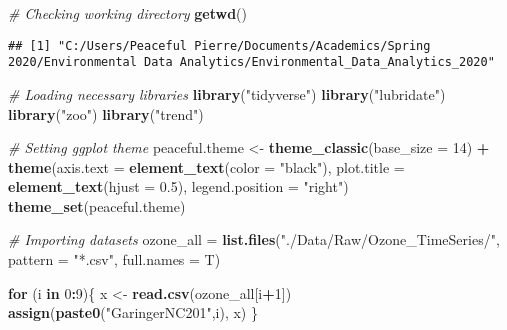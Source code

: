 \documentclass[
]{article}
\newenvironment{Shaded}{\begin{snugshade}}{\end{snugshade}}
\newcommand{\CommentTok}[1]{\textcolor[rgb]{0.56,0.35,0.01}{\textit{#1}}}
\newcommand{\ControlFlowTok}[1]{\textcolor[rgb]{0.13,0.29,0.53}{\textbf{#1}}}
\newcommand{\DataTypeTok}[1]{\textcolor[rgb]{0.13,0.29,0.53}{#1}}
\newcommand{\DecValTok}[1]{\textcolor[rgb]{0.00,0.00,0.81}{#1}}
\newcommand{\FloatTok}[1]{\textcolor[rgb]{0.00,0.00,0.81}{#1}}
\newcommand{\KeywordTok}[1]{\textcolor[rgb]{0.13,0.29,0.53}{\textbf{#1}}}
\newcommand{\NormalTok}[1]{#1}
\newcommand{\OperatorTok}[1]{\textcolor[rgb]{0.81,0.36,0.00}{\textbf{#1}}}
\newcommand{\StringTok}[1]{\textcolor[rgb]{0.31,0.60,0.02}{#1}}
\begin{document}
\begin{Shaded}
\begin{Highlighting}[]
\CommentTok{\# Checking working directory}
\KeywordTok{getwd}\NormalTok{()}
\end{Highlighting}
\end{Shaded}

\begin{verbatim}
## [1] "C:/Users/Peaceful Pierre/Documents/Academics/Spring 2020/Environmental Data Analytics/Environmental_Data_Analytics_2020"
\end{verbatim}

\begin{Shaded}
\begin{Highlighting}[]
\CommentTok{\# Loading necessary libraries}
\KeywordTok{library}\NormalTok{(}\StringTok{"tidyverse"}\NormalTok{)}
\KeywordTok{library}\NormalTok{(}\StringTok{"lubridate"}\NormalTok{)}
\KeywordTok{library}\NormalTok{(}\StringTok{"zoo"}\NormalTok{)}
\KeywordTok{library}\NormalTok{(}\StringTok{"trend"}\NormalTok{)}

\CommentTok{\# Setting ggplot theme}
\NormalTok{peaceful.theme <{-}}\StringTok{ }\KeywordTok{theme\_classic}\NormalTok{(}\DataTypeTok{base\_size =} \DecValTok{14}\NormalTok{) }\OperatorTok{+}
\StringTok{  }\KeywordTok{theme}\NormalTok{(}\DataTypeTok{axis.text =} \KeywordTok{element\_text}\NormalTok{(}\DataTypeTok{color =} \StringTok{"black"}\NormalTok{),}
        \DataTypeTok{plot.title =} \KeywordTok{element\_text}\NormalTok{(}\DataTypeTok{hjust =} \FloatTok{0.5}\NormalTok{),}
        \DataTypeTok{legend.position =} \StringTok{"right"}\NormalTok{)}
\KeywordTok{theme\_set}\NormalTok{(peaceful.theme)}

\CommentTok{\# Importing datasets}
\NormalTok{ozone\_all =}\StringTok{ }\KeywordTok{list.files}\NormalTok{(}\StringTok{"./Data/Raw/Ozone\_TimeSeries/"}\NormalTok{, }
                   \DataTypeTok{pattern =} \StringTok{"*.csv"}\NormalTok{,}
                   \DataTypeTok{full.names =}\NormalTok{ T)}

\ControlFlowTok{for}\NormalTok{ (i }\ControlFlowTok{in} \DecValTok{0}\OperatorTok{:}\DecValTok{9}\NormalTok{)\{}
\NormalTok{  x <{-}}\StringTok{ }\KeywordTok{read.csv}\NormalTok{(ozone\_all[i}\OperatorTok{+}\DecValTok{1}\NormalTok{])}
  \KeywordTok{assign}\NormalTok{(}\KeywordTok{paste0}\NormalTok{(}\StringTok{"GaringerNC201"}\NormalTok{,i), x)}
\NormalTok{\}}
\end{Highlighting}
\end{Shaded}
\end{document}
